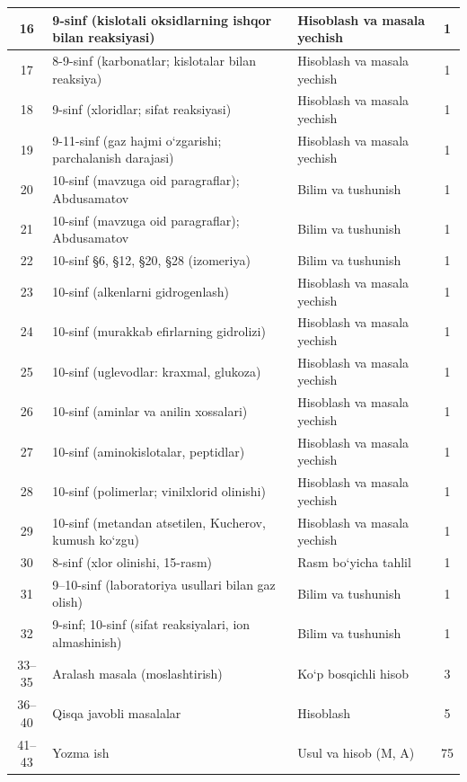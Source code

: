 \documentclass[11pt,a4paper]{article}
\begin{document}
{\begin{longtable}{|c|p{7.2cm}|p{5.4cm}|c|}
16 & 9-sinf (kislotali oksidlarning ishqor bilan reaksiyasi) & Hisoblash va masala yechish & 1\\\hline
17 & 8-9-sinf (karbonatlar; kislotalar bilan reaksiya) & Hisoblash va masala yechish & 1\\\hline
18 & 9-sinf (xloridlar; sifat reaksiyasi) & Hisoblash va masala yechish & 1\\\hline
19 & 9-11-sinf (gaz hajmi o`zgarishi; parchalanish darajasi) & Hisoblash va masala yechish & 1\\\hline
20 & 10-sinf (mavzuga oid paragraflar); Abdusamatov & Bilim va tushunish & 1\\\hline
21 & 10-sinf (mavzuga oid paragraflar); Abdusamatov & Bilim va tushunish & 1\\\hline
22 & 10-sinf \S{}6, \S{}12, \S{}20, \S{}28 (izomeriya) & Bilim va tushunish & 1\\\hline
23 & 10-sinf (alkenlarni gidrogenlash) & Hisoblash va masala yechish & 1\\\hline
24 & 10-sinf (murakkab efirlarning gidrolizi) & Hisoblash va masala yechish & 1\\\hline
25 & 10-sinf (uglevodlar: kraxmal, glukoza) & Hisoblash va masala yechish & 1\\\hline
26 & 10-sinf (aminlar va anilin xossalari) & Hisoblash va masala yechish & 1\\\hline
27 & 10-sinf (aminokislotalar, peptidlar) & Hisoblash va masala yechish & 1\\\hline
28 & 10-sinf (polimerlar; vinilxlorid olinishi) & Hisoblash va masala yechish & 1\\\hline
29 & 10-sinf (metandan atsetilen, Kucherov, kumush ko`zgu) & Hisoblash va masala yechish & 1\\\hline
30 & 8-sinf (xlor olinishi, 15-rasm) & Rasm bo`yicha tahlil & 1\\\hline
31 & 9--10-sinf (laboratoriya usullari bilan gaz olish) & Bilim va tushunish & 1\\\hline
32 & 9-sinf; 10-sinf (sifat reaksiyalari, ion almashinish) & Bilim va tushunish & 1\\\hline
33--35 & Aralash masala (moslashtirish) & Ko`p bosqichli hisob & 3\\\hline
36--40 & Qisqa javobli masalalar & Hisoblash & 5\\\hline
41--43 & Yozma ish & Usul va hisob (M, A) & 75\\\hline
\end{longtable}}
\end{document}
